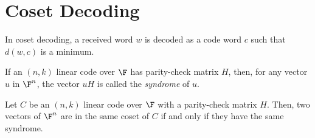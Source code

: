 \section{Coset Decoding}

\begin{theorem}
	In coset decoding, a received word $w$ is decoded as a code word $c$ such that $d(w,c)$ is a minimum.
\end{theorem}

\begin{definition}[Syndrome]
	If an $(n,k)$ linear code over $\F$ has parity-check matrix $H$, then, for any vector $u$ in $\F^n$, the vector $uH$ is called the \textit{syndrome} of $u$.
\end{definition}

\begin{theorem}
	Let $C$ be an $(n,k)$ linear code over $\F$ with a parity-check matrix $H$. Then, two vectors of $\F^n$ are in the same coset of $C$ if and only if they have the same syndrome.
\end{theorem}
